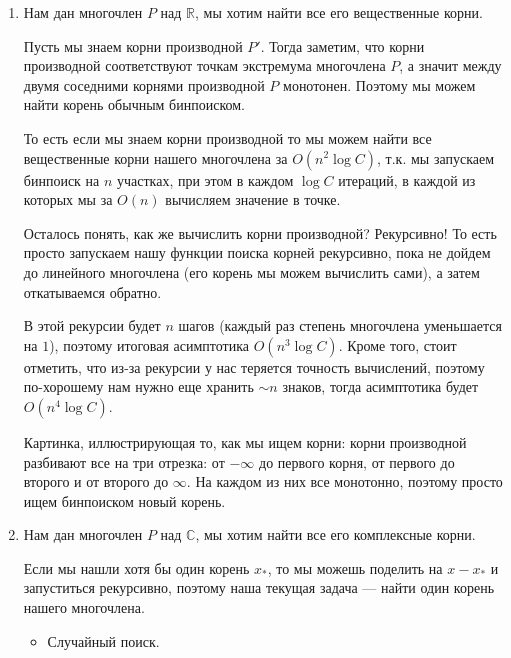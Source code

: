 \begin{enumerate}
	\item
		Нам дан многочлен $P$ над $\mathbb{R}$, мы хотим найти все его вещественные корни. 

		Пусть мы знаем корни производной $P'$.
		Тогда заметим, что корни производной соответствуют точкам экстремума многочлена $P$, а значит между двумя соседними корнями производной $P$ монотонен.
		Поэтому мы можем найти корень обычным бинпоиском.

		То есть если мы знаем корни производной то мы можем найти все вещественные корни нашего многочлена за $O(n^2 \log C)$, т.к. мы запускаем бинпоиск на $n$ участках,
		при этом в каждом $\log C$ итераций, в каждой из которых мы за $O(n)$ вычисляем значение в точке.

		Осталось понять, как же вычислить корни производной? 
		Рекурсивно!
		То есть просто запускаем нашу функции поиска корней рекурсивно, пока не дойдем до линейного многочлена (его корень мы можем вычислить сами), а затем откатываемся обратно.

		В этой рекурсии будет $n$ шагов (каждый раз степень многочлена уменьшается на $1$), поэтому итоговая асимптотика $O(n^3\log C)$.
		Кроме того, стоит отметить, что из-за рекурсии у нас теряется точность вычислений, поэтому по-хорошему нам нужно еще хранить ${\sim}n$ знаков, тогда асимптотика будет $O(n^4 \log C)$.


		Картинка, иллюстрирующая то, как мы ищем корни: корни производной разбивают все на три отрезка: от $-\infty$ до первого корня, от первого до второго и от второго до $\infty$.
		На каждом из них все монотонно, поэтому просто ищем бинпоиском новый корень.
	\item
		Нам дан многочлен $P$ над $\mathbb{C}$, мы хотим найти все его комплексные корни.

		Если мы нашли хотя бы один корень $x_*$, то мы можешь поделить на $x-x_*$ и запуститься рекурсивно, поэтому наша текущая задача --- найти один корень нашего многочлена.
		\begin{itemize}
			\item
				Случайный поиск.


\end{itemize}
\end{enumerate}
